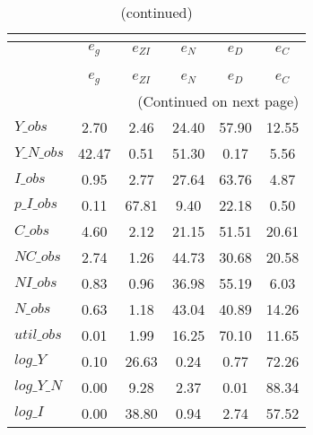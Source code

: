  
\begin{center}
\begin{longtable}{lccccc} 
\caption{VARIANCE DECOMPOSITION (in percent)}\\
 \label{Table:th_var_decomp_uncond}\\
\toprule 
$           $	 & 	 $       {e_g}$	 & 	 $    {e_{ZI}}$	 & 	 $       {e_N}$	 & 	 $       {e_D}$	 & 	 $       {e_C}$\\
\midrule \endfirsthead 
\caption{(continued)}\\
 \toprule \\ 
$           $	 & 	 $       {e_g}$	 & 	 $    {e_{ZI}}$	 & 	 $       {e_N}$	 & 	 $       {e_D}$	 & 	 $       {e_C}$\\
\midrule \endhead 
\midrule \multicolumn{6}{r}{(Continued on next page)} \\ \bottomrule \endfoot 
\bottomrule \endlastfoot 
$Y\_obs     $	 & 	        2.70	 & 	        2.46	 & 	       24.40	 & 	       57.90	 & 	       12.55 \\ 
$Y\_N\_obs  $	 & 	       42.47	 & 	        0.51	 & 	       51.30	 & 	        0.17	 & 	        5.56 \\ 
$I\_obs     $	 & 	        0.95	 & 	        2.77	 & 	       27.64	 & 	       63.76	 & 	        4.87 \\ 
$p\_I\_obs  $	 & 	        0.11	 & 	       67.81	 & 	        9.40	 & 	       22.18	 & 	        0.50 \\ 
$C\_obs     $	 & 	        4.60	 & 	        2.12	 & 	       21.15	 & 	       51.51	 & 	       20.61 \\ 
$NC\_obs    $	 & 	        2.74	 & 	        1.26	 & 	       44.73	 & 	       30.68	 & 	       20.58 \\ 
$NI\_obs    $	 & 	        0.83	 & 	        0.96	 & 	       36.98	 & 	       55.19	 & 	        6.03 \\ 
$N\_obs     $	 & 	        0.63	 & 	        1.18	 & 	       43.04	 & 	       40.89	 & 	       14.26 \\ 
$util\_obs  $	 & 	        0.01	 & 	        1.99	 & 	       16.25	 & 	       70.10	 & 	       11.65 \\ 
$log\_Y     $	 & 	        0.10	 & 	       26.63	 & 	        0.24	 & 	        0.77	 & 	       72.26 \\ 
$log\_Y\_N  $	 & 	        0.00	 & 	        9.28	 & 	        2.37	 & 	        0.01	 & 	       88.34 \\ 
$log\_I     $	 & 	        0.00	 & 	       38.80	 & 	        0.94	 & 	        2.74	 & 	       57.52 \\ 

\end{longtable}
\end{center}
